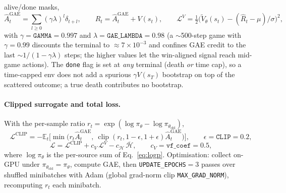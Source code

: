 \documentclass[11pt]{article}
\newcommand{\E}{\mathbb{E}}
\newcommand{\Adv}{\widehat{A}}
\newcommand{\pol}{\pi_\theta}
\newcommand{\polold}{\pi_{\theta_{\mathrm{old}}}}
\newcommand{\clip}{\operatorname{clip}}
\newcommand{\cd}[1]{\texttt{#1}}
\begin{document}
alive/done masks,
\begin{equation}
\Adv^{\mathrm{GAE}}_t=\sum_{l\ge0}(\gamma\lambda)^l\delta_{t+l},\qquad
\hat R_t=\Adv^{\mathrm{GAE}}_t+V(s_t),\qquad
\mathcal L^V=\tfrac12\big(\tilde V_\theta(s_t)-(\hat R_t-\mu)/\sigma\big)^2,
\end{equation}
with $\gamma=\cd{GAMMA}=0.997$ and $\lambda=\cd{GAE\_LAMBDA}=0.98$ (a $\sim$500-step game with
$\gamma{=}0.99$ discounts the terminal to $\approx7\!\times\!10^{-3}$ and confines GAE credit to the last
$\sim1/(1{-}\gamma\lambda)$ steps; the higher values let the win-aligned signal reach mid-game actions).
The \cd{done} flag is set at \emph{any} terminal (death \emph{or} time cap), so a time-capped env does not
add a spurious $\gamma V(s_T)$ bootstrap on top of the scattered outcome; a true death contributes no
bootstrap.

\paragraph{Clipped surrogate and total loss.} With the per-sample ratio $r_t=\exp(\log\pol-\log\polold)$,
\begin{equation}
\mathcal L^{\mathrm{CLIP}}=-\E_t\Big[\min\!\big(r_t\Adv^{\mathrm{GAE}}_t,\ \clip(r_t,1{-}\epsilon,1{+}\epsilon)\Adv^{\mathrm{GAE}}_t\big)\Big],
\qquad \epsilon=\cd{CLIP}=0.2,
\end{equation}
\begin{equation}
\mathcal L=\mathcal L^{\mathrm{CLIP}}+c_V\,\mathcal L^V-c_{\mathcal H}\,\overline{\mathcal H},
\qquad c_V=\cd{vf\_coef}=0.5,
\end{equation}
where $\log\pol$ is the per-source sum of Eq.~\eqref{eq:logp}. Optimisation: collect on-GPU under
$\polold=\pol$, compute GAE, then \cd{UPDATE\_EPOCHS}$=3$ passes over shuffled minibatches with Adam
(global grad-norm clip \cd{MAX\_GRAD\_NORM}), recomputing $r_t$ each minibatch.
\end{document}
